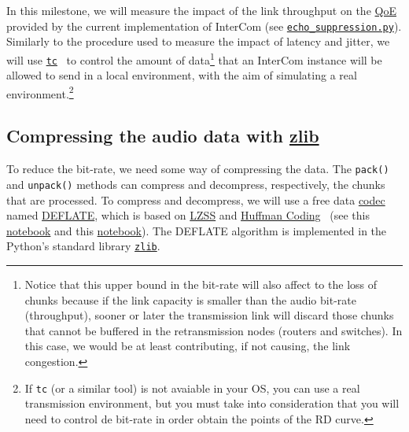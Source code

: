 In this milestone, we will measure the impact of the link throughput
on the \href{https://en.wikipedia.org/wiki/Quality_of_experience}{QoE}
provided by the current implementation of InterCom
(see \href{https://github.com/Tecnologias-multimedia/InterCom/blob/master/src/echo_suppression.py}{\texttt{echo\_suppression.py}}). Similarly
to the procedure used to measure the impact of latency and jitter, we
will use
\href{https://man7.org/linux/man-pages/man8/tc.8.html}{\texttt{tc}}~\cite{bert2012lartc}
to control the amount of data\footnote{Notice that this upper bound in
  the bit-rate will also affect to the loss of chunks because if the
  link capacity is smaller than the audio bit-rate (throughput),
  sooner or later the transmission link will discard those chunks that
  cannot be buffered in the retransmission nodes (routers and
  switches). In this case, we would be at least contributing, if not
  causing, the link congestion.} that an InterCom instance will be
allowed to send in a local environment, with the aim of simulating a
real environment.\footnote{If \texttt{tc} (or a similar tool) is not
  avaiable in your OS, you can use a real transmission environment,
  but you must take into consideration that you will need to control
  de bit-rate in order obtain the points of the RD curve.}

\subsection{Compressing the audio data with \href{https://zlib.net/}{zlib}}
To reduce the bit-rate, we need some way of compressing the data. The
\verb|pack()| and \verb|unpack()| methods can compress and
decompress, respectively, the chunks that are processed. To compress
and decompress, we will use a free data
\href{https://en.wikipedia.org/wiki/Codec}{codec} named
\href{https://en.wikipedia.org/wiki/DEFLATE}{DEFLATE}, which is based
on
\href{https://en.wikipedia.org/wiki/Lempel%E2%80%93Ziv%E2%80%93Storer%E2%80%93Szymanski}{LZSS}
  and \href{https://en.wikipedia.org/wiki/Huffman_coding}{Huffman
    Coding}~\cite{nelson96datacompression} (see this
  \href{https://github.com/vicente-gonzalez-ruiz/LZ77/blob/master/index.ipynb}{notebook} and
  this
  \href{https://github.com/vicente-gonzalez-ruiz/Huffman_coding/blob/master/index.ipynb}{notebook}). The
  DEFLATE algorithm is implemented in the Python's standard library
  \href{https://docs.python.org/3/library/zlib.html}{\texttt{zlib}}. %

